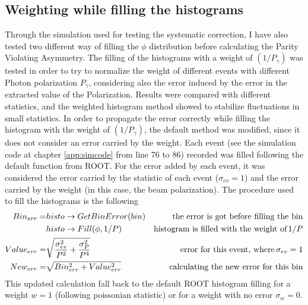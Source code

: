 \subsection{Weighting while filling the histograms} \label{sec:weighthisto}
Through the simulation used for testing the systematic correction, I have also tested two different way of filling the $\phi$ distribution before calculating the Parity Violating Asymmetry. The filling of the histograms with a weight of $(1/P_{\gamma})$ was tested in order to try to normalize the weight of different events with different Photon polarization  $P_{\gamma}$, considering also the error induced by the error in the extracted value of the Polarization. Results were compared with different statistics, and the weighted histogram method showed to stabilize fluctuations in small statistics. In order to propagate the error correctly while filling the histogram with the weight of $(1/P_{\gamma})$, the default method  was modified, since it does not consider an error carried by the weight.
Each event (see the simulation code at chapter \ref{app:simcode} from line 76 to 86) recorded was filled following the default function from ROOT. For the error added by each event, it was considered the error carried by the statistic of each event ($\sigma_{ev} = 1$) and the error carried by the weight (in this case, the beam polarization). The procedure used to fill the histograms is the following 
\begin{align}
  Bin_{err} = & histo\rightarrow GetBinError(bin) &  \textnormal{the error is  got before filling the bin} \\
  &  histo\rightarrow Fill(\phi,1/P) & \textnormal{histogram is filled with the weight of}\, 1/P \\
  Value_{err} = & \sqrt{\frac{\sigma_{ev}^2}{P^2} + \frac{\sigma_P^2}{P^4}} & \textnormal{error for this event, where}\, \sigma_{ev}=1 \\
  New_{err} = & \sqrt{Bin_{err}^2 + Value_{err}^2} & \textnormal{calculating the new error for this bin}
\end{align}
This updated calculation fall back to the default ROOT histogram filling for a weight $w=1$ (following poissonian statistic) or for a weight with no error $\sigma_w = 0$.

